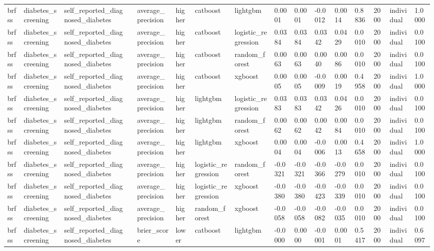 \begin{tabular}{llllllllllllllll}
brfss & diabetes\_screening & self\_reported\_diagnosed\_diabetes &  & average\_precision & higher & catboost & lightgbm & 0.0001 & 0.0001 & -0.0012 & 0.0014 & 0.8836 & 2000 & individual & 1.0000 \\
brfss & diabetes\_screening & self\_reported\_diagnosed\_diabetes &  & average\_precision & higher & catboost & logistic\_regression & 0.0384 & 0.0384 & 0.0342 & 0.0429 & 0.0010 & 2000 & individual & 0.0100 \\
brfss & diabetes\_screening & self\_reported\_diagnosed\_diabetes &  & average\_precision & higher & catboost & random\_forest & 0.0063 & 0.0063 & 0.0040 & 0.0086 & 0.0010 & 2000 & individual & 0.0100 \\
brfss & diabetes\_screening & self\_reported\_diagnosed\_diabetes &  & average\_precision & higher & catboost & xgboost & 0.0005 & 0.0005 & -0.0009 & 0.0019 & 0.4958 & 2000 & individual & 1.0000 \\
brfss & diabetes\_screening & self\_reported\_diagnosed\_diabetes &  & average\_precision & higher & lightgbm & logistic\_regression & 0.0383 & 0.0383 & 0.0342 & 0.0426 & 0.0010 & 2000 & individual & 0.0100 \\
brfss & diabetes\_screening & self\_reported\_diagnosed\_diabetes &  & average\_precision & higher & lightgbm & random\_forest & 0.0062 & 0.0062 & 0.0042 & 0.0084 & 0.0010 & 2000 & individual & 0.0100 \\
brfss & diabetes\_screening & self\_reported\_diagnosed\_diabetes &  & average\_precision & higher & lightgbm & xgboost & 0.0004 & 0.0004 & -0.0006 & 0.0013 & 0.4658 & 2000 & individual & 1.0000 \\
brfss & diabetes\_screening & self\_reported\_diagnosed\_diabetes &  & average\_precision & higher & logistic\_regression & random\_forest & -0.0321 & -0.0321 & -0.0366 & -0.0279 & 0.0010 & 2000 & individual & 0.0100 \\
brfss & diabetes\_screening & self\_reported\_diagnosed\_diabetes &  & average\_precision & higher & logistic\_regression & xgboost & -0.0380 & -0.0380 & -0.0423 & -0.0339 & 0.0010 & 2000 & individual & 0.0100 \\
brfss & diabetes\_screening & self\_reported\_diagnosed\_diabetes &  & average\_precision & higher & random\_forest & xgboost & -0.0058 & -0.0058 & -0.0082 & -0.0035 & 0.0010 & 2000 & individual & 0.0100 \\
brfss & diabetes\_screening & self\_reported\_diagnosed\_diabetes &  & brier\_score & lower & catboost & lightgbm & -0.0000 & 0.0000 & -0.0001 & 0.0001 & 0.5417 & 2000 & individual & 0.6097 \\

\end{tabular}
